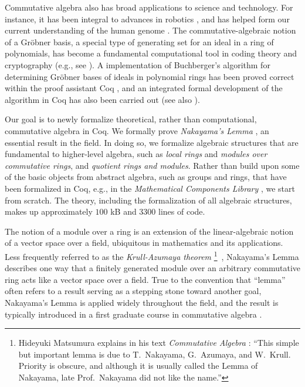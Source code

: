 \documentclass{article}
\begin{document}
Commutative algebra also has broad applications to science and technology. For
instance, it has been integral to advances in robotics \cite{cox-little-oshea},
and has helped form our current understanding of the human genome
\cite{genetic-algebra}. The commutative-algebraic notion of a Gr\"{o}bner
basis, a special type of generating set for an ideal in a ring of polynomials,
has become a fundamental computational tool in coding theory and cryptography
(e.g., see  \cite{grobner-bases-cryptography}). A implementation of
Buchberger's algorithm \cite{buchberger} for determining Gr\"obner bases of
ideals in polynomial rings has been proved correct within the proof assistant
Coq \cite{the_coq_development_team_2019_3476303,thery-buchberger}, and an
integrated formal development of the algorithm in Coq has also been carried out
\cite{persson2001integrated} (see also \cite{grobner-type-theory}). 

Our goal is to newly formalize theoretical, rather than computational,
commutative algebra in Coq. We formally prove \emph{Nakayama's Lemma}
\cite{nakayama-1951, azumaya}, an essential result in the field. In doing so,
we formalize algebraic structures that are fundamental to higher-level algebra,
such as \emph{local rings} and \emph{modules over commutative rings}, and
\emph{quotient rings and modules}. Rather than build upon some of the basic
objects from abstract algebra, such as groups and rings, that have been
formalized in Coq, e.g., in the \emph{Mathematical Components Library}
\cite{mathcomp}, we start from scratch.
The theory, including the formalization of all algebraic structures, makes up
approximately $100$ kB and 3300 lines of code.
 
The notion of a module over a ring is an extension of the linear-algebraic
notion of a vector space over a field, ubiquitous in mathematics and its
applications. Less frequently referred to as the \emph{Krull-Azumaya theorem}
\footnote{Hideyuki Matsumura explains in his text \emph{Commutative Algebra}
  \cite{matsumura}: ``{This simple but important lemma is due to T.\ Nakayama,
  G.\ Azumaya, and W.\ Krull. Priority is obscure, and although it is usually
  called the Lemma of Nakayama, late Prof.\  Nakayama did not like the
  name.''}}
\,\cite{nagata}, Nakayama's Lemma describes one way that a finitely generated
module over an arbitrary commutative ring acts like a vector space over a
field. True to the convention that ``lemma'' often refers to a result serving
as a stepping stone toward another goal, Nakayama's Lemma is applied widely
throughout the field, and the result is typically introduced in a first
graduate course in commutative algebra \cite{atiyah-macdonald, matsumura,
eisenbud}.
\end{document}
